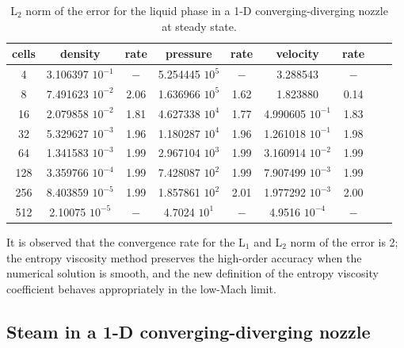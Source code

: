 %
%
\begin{table}[H]
\begin{center}
 \caption{\label{tbl:l2_norm_liq} L$_2$ norm of the error for the liquid phase in a 1-D converging-diverging nozzle at steady state.}
 \begin{tabular}{|c|c|c|c|c|c|c|c|c|}
 \hline
cells& density            & rate & pressure          & rate & velocity           & rate \\ \hline
4    & 3.106397 $10^{-1}$ & $-$  & 5.254445 $10^{5}$ & $-$  & 3.288543           & $-$  \\ \hline
8    & 7.491623 $10^{-2}$ & 2.06 & 1.636966 $10^{5}$ & 1.62 & 1.823880           & 0.14 \\ \hline
16   & 2.079858 $10^{-2}$ & 1.81 & 4.627338 $10^{4}$ & 1.77 & 4.990605 $10^{-1}$ & 1.83 \\ \hline
32   & 5.329627 $10^{-3}$ & 1.96 & 1.180287 $10^{4}$ & 1.96 & 1.261018 $10^{-1}$ & 1.98 \\ \hline
64   & 1.341583 $10^{-3}$ & 1.99 & 2.967104 $10^{3}$ & 1.99 & 3.160914 $10^{-2}$ & 1.99 \\ \hline
128  & 3.359766 $10^{-4}$ & 1.99 & 7.428087 $10^{2}$ & 1.99 & 7.907499 $10^{-3}$ & 1.99 \\ \hline
256  & 8.403859 $10^{-5}$ & 1.99 & 1.857861 $10^{2}$ & 2.01 & 1.977292 $10^{-3}$ & 2.00 \\ \hline
512  & 2.10075  $10^{-5}$ & $-$ & 4.7024   $10^{1}$ & $-$ & 4.9516   $10^{-4}$ & $-$ \\ \hline
\end{tabular}
\end{center}
\end{table}
It is observed that the convergence rate for the L$_1$ and L$_2$ norm of the error is 2; the entropy viscosity method preserves the high-order accuracy when the numerical solution is smooth, and the new definition of the entropy viscosity coefficient behaves appropriately in the low-Mach limit.

\subsection{Steam in a 1-D converging-diverging nozzle} \label{sec:steam_nozzle}


